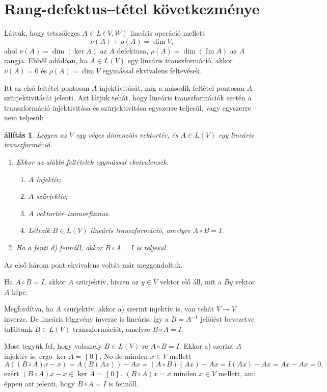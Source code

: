 \documentclass[9pt, a4paper, showtrims]{memoir}
\makeatletter
\renewenvironment{proof}[1][\proofname]
    {\par\pushQED{\qed}%
    \normalfont \topsep6\p@\@plus6\p@\relax
    \trivlist
    \item[\hskip\labelsep
        \itshape
    #1\@addpunct{:}]\ignorespaces}
    {\popQED\endtrivlist\@endpefalse}
\theoremstyle{plain}
\newtheorem{proposition}{állítás}[chapter]
\theoremstyle{remark}
\theoremstyle{definition}
\DeclareMathOperator{\im}{Im}
\makeatother
\begin{document}
\section{Rang-defektus--tétel következménye}
Láttuk, hogy tetszőleges $A\in L\left( V,W \right)$ lineáris operáció mellett
\[
    \nu\left( A \right)+\rho\left( A \right)=\dim V,
\]
ahol $\nu\left( A \right)=\dim\left( \ker A \right)$ az $A$ defektusa,
$\rho\left( A \right)=\dim\left(\im A \right)$ az $A$ rangja.
Ebből adódóan, ha $A\in L\left( V \right)$ egy lineáris transzformáció,
akkor $\nu\left( A \right)=0$ és $\rho\left( A \right)=\dim V$ egymással ekvivalens feltevések.

Itt az első feltétel pontosan $A$ injektivitását, 
míg a második feltétel pontosan $A$ szürjektivitását jelenti.
Azt látjuk tehát, 
hogy lineáris transzformációk esetén a transzformáció injektivitása és szürjektivitása egyszerre teljesül, 
vagy egyszerre nem teljesül:
\begin{proposition}
    Legyen az $V$ egy véges dimenziós vektortér, és $A\in L\left( V \right)$ egy lineáris transzformáció.
    \begin{enumerate}
        \item 
            Ekkor az alábbi feltételek egymással ekvivalensek.
            \begin{enumerate}
                \item $A$ injektív;
                \item $A$ szürjektív;
                \item $A$ vektortér--izomorfizmus.
                \item Létezik $B\in L\left( V \right)$ lineáris transzformáció, amelyre $A\circ B=I$.
            \end{enumerate}
        \item
            Ha a fenti d) fennáll, akkor $B\circ A=I$ is teljesül.\qedhere
    \end{enumerate}
\end{proposition}
\begin{proof}
    Az első három pont ekvivalens voltát már meggondoltuk.

    Ha $A\circ B=I$, akkor $A$ szürjektív, hiszen az $y\in V$ vektor elő áll,
    mit a $By$ vektor $A$ képe.

    Megfordítva, ha $A$ szürjektív, akkor a) szerint injektív is, van tehát $V\to V$ inverze.
    De lineáris függvény inverze is lineáris, 
    így a $B=A^{-1}$ jelölést bevezetve találtunk $B\in L\left( V \right)$
    transzformációt, amelyre $B\circ A=I$.

    Most tegyük fel, hogy valamely $B\in L\left( V \right)$-re $A\circ B=I$.
    Ekkor a) szerint $A$ injektív is, ergo $\ker A=\left\{ 0 \right\}$.
    No de minden $x\in V$ mellett
    \[
        A\left( (B\circ A)x-x \right)
        =
        A\left( B\left( Ax \right) \right)-Ax
        =
        \left( A\circ B \right)\left( Ax \right)-Ax
        =
        I\left( Ax \right)-Ax
        =
        Ax-Ax=0,
    \]
    ezért $(B\circ A)x-x\in\ker A=\left\{ 0 \right\}$. 
    $(B\circ A)x=x$ minden $x\in V$ mellett, ami éppen azt jelenti, hogy $B\circ A=I$ is fennáll.
\end{proof}
\end{document}
